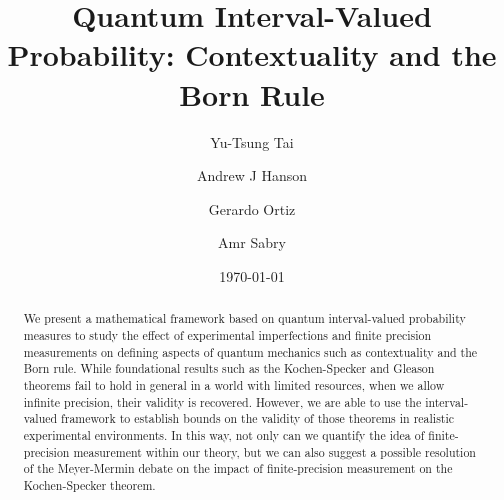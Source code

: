\documentclass[english,reprint, aps, prl,superscriptaddress, showpacs,
showkeys, longbibliography, amsmath, amssymb]{revtex4-1}
\theoremstyle{plain}
\theoremstyle{definition}
\begin{document}
\title{Quantum Interval-Valued Probability: Contextuality and the Born Rule}

\author{Yu-Tsung Tai}

\author{Andrew J Hanson}

\author{Gerardo Ortiz}

\author{Amr Sabry}

\date{\today}

\begin{abstract}

We present a mathematical framework based on quantum interval-valued
probability measures to study the effect of experimental imperfections
and finite precision measurements on defining aspects of quantum
mechanics such as contextuality and the Born rule. While foundational
results such as the Kochen-Specker and Gleason theorems fail to hold
in general in a world with limited resources, when we allow infinite
precision, their validity is recovered.  However, we are able to use
the interval-valued framework to establish bounds on the validity of
those theorems in realistic experimental environments. In this way,
not only can we quantify the idea of finite-precision measurement
within our theory, but we can also suggest a possible resolution of
the Meyer-Mermin debate on the impact of finite-precision measurement
on the Kochen-Specker theorem.


\end{abstract}


\begin{comment}
\keywords{Finite precision measurement, the Born rule, Gleason's
theorem, the Kochen-Specker theorem, interval-valued probability measure,
discrete quantum theory}
\end{comment}

\maketitle
\end{document}
